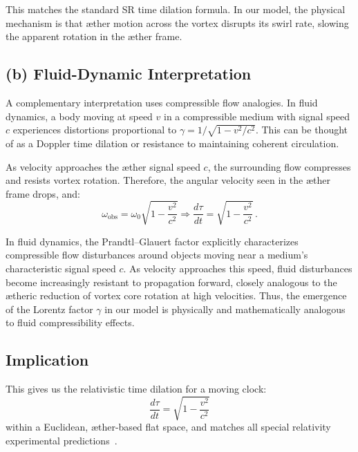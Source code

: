 This matches the standard SR time dilation formula. In our model, the physical mechanism is that æther motion across the vortex disrupts its swirl rate, slowing the apparent rotation in the æther frame.

\subsection*{(b) Fluid-Dynamic Interpretation}

A complementary interpretation uses compressible flow analogies. In fluid dynamics, a body moving at speed $v$ in a compressible medium with signal speed $c$ experiences distortions proportional to $\gamma = 1/\sqrt{1 - v^2/c^2}$. This can be thought of as a Doppler time dilation or resistance to maintaining coherent circulation. 

As velocity approaches the æther signal speed $c$, the surrounding flow compresses and resists vortex rotation. Therefore, the angular velocity seen in the æther frame drops, and:
\[
\omega_{\text{obs}} = \omega_0 \sqrt{1 - \frac{v^2}{c^2}} \Rightarrow \frac{d\tau}{dt} = \sqrt{1 - \frac{v^2}{c^2}} \,. \tag{3}
\]


In fluid dynamics, the Prandtl–Glauert factor explicitly characterizes compressible flow disturbances around objects moving near a medium’s characteristic signal speed $c$. As velocity approaches this speed, fluid disturbances become increasingly resistant to propagation forward, closely analogous to the ætheric reduction of vortex core rotation at high velocities. Thus, the emergence of the Lorentz factor $\gamma$ in our model is physically and mathematically analogous to fluid compressibility effects.


\subsection*{Implication}

This gives us the relativistic time dilation for a moving clock:
\[
\boxed{\frac{d\tau}{dt} = \sqrt{1 - \frac{v^2}{c^2}}}
\]
within a Euclidean, æther-based flat space, and matches all special relativity experimental predictions~\cite{Rado2020-aether-Lorentz,Levy2009-aether-clock}.
